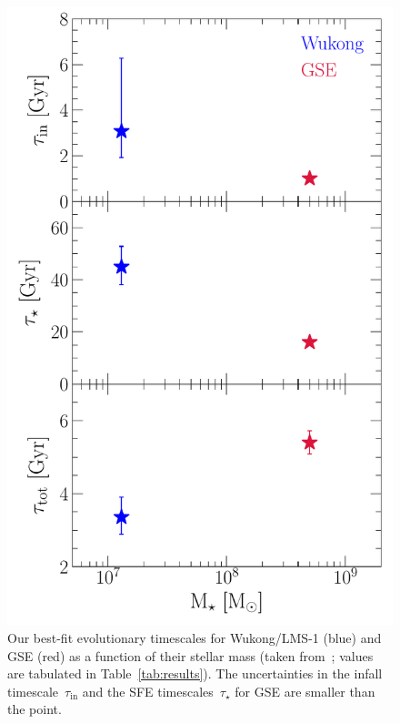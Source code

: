 \documentclass[ms.tex]{subfiles}
\begin{document}
\begin{figure}
\centering
\includegraphics[scale = 0.6]{gse_wukong_timescales.pdf}
\caption{
Our best-fit evolutionary timescales for Wukong/LMS-1 (blue) and GSE (red) as a
function of their stellar mass (taken from~\citealt{Naidu2022}; values are
tabulated in Table~\ref{tab:results}).
The uncertainties in the infall timescale~$\tau_\text{in}$ and the SFE
timescales~$\tau_\star$ for GSE are smaller than the point.
}
\label{fig:gse_wukong_timescales}
\end{figure}
\end{document}
